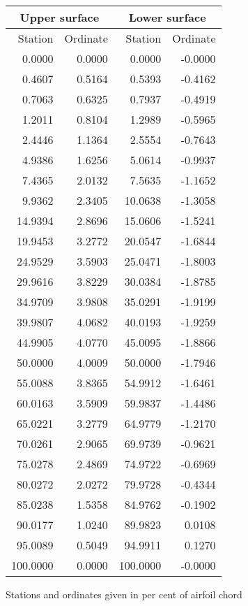 \documentclass[11pt]{book}
\begin{document}
 \hspace{4mm}
 \begin{tabular}{|r|r|r|r|} \hline 
 \multicolumn{2}{|c|}{Upper surface} & \multicolumn{2}{|c|}{Lower surface} \\
 \hline
 Station & Ordinate & Station & Ordinate \\
 \hline
0.0000 & 0.0000 & 0.0000 & -0.0000 \\
0.4607 & 0.5164 & 0.5393 & -0.4162 \\
0.7063 & 0.6325 & 0.7937 & -0.4919 \\
1.2011 & 0.8104 & 1.2989 & -0.5965 \\
2.4446 & 1.1364 & 2.5554 & -0.7643 \\
4.9386 & 1.6256 & 5.0614 & -0.9937 \\
7.4365 & 2.0132 & 7.5635 & -1.1652 \\
9.9362 & 2.3405 & 10.0638 & -1.3058 \\
14.9394 & 2.8696 & 15.0606 & -1.5241 \\
19.9453 & 3.2772 & 20.0547 & -1.6844 \\
24.9529 & 3.5903 & 25.0471 & -1.8003 \\
29.9616 & 3.8229 & 30.0384 & -1.8785 \\
34.9709 & 3.9808 & 35.0291 & -1.9199 \\
39.9807 & 4.0682 & 40.0193 & -1.9259 \\
44.9905 & 4.0770 & 45.0095 & -1.8866 \\
50.0000 & 4.0009 & 50.0000 & -1.7946 \\
55.0088 & 3.8365 & 54.9912 & -1.6461 \\
60.0163 & 3.5909 & 59.9837 & -1.4486 \\
65.0221 & 3.2779 & 64.9779 & -1.2170 \\
70.0261 & 2.9065 & 69.9739 & -0.9621 \\
75.0278 & 2.4869 & 74.9722 & -0.6969 \\
80.0272 & 2.0272 & 79.9728 & -0.4344 \\
85.0238 & 1.5358 & 84.9762 & -0.1902 \\
90.0177 & 1.0240 & 89.9823 & 0.0108 \\
95.0089 & 0.5049 & 94.9911 & 0.1270 \\
100.0000 & 0.0000 & 100.0000 & -0.0000 \\
 \hline 
 \end{tabular}
 \vspace{8mm}

Stations and ordinates given in per cent of airfoil chord
\end{document}
